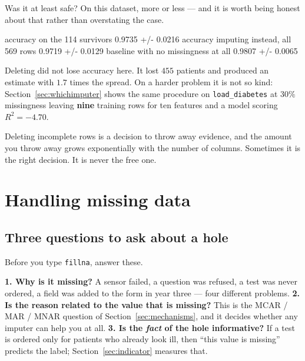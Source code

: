 \documentclass[11pt]{article}
\begin{document}
Was it at least safe? On this dataset, more or less --- and it is worth being
honest about that rather than overstating the case.

\begin{codeout}
accuracy on the 114 survivors             0.9735  +/- 0.0216
accuracy imputing instead, all 569 rows   0.9719  +/- 0.0129
baseline with no missingness at all       0.9807  +/- 0.0065
\end{codeout}

Deleting did not lose accuracy here. It lost $455$ patients and produced an
estimate with $1.7$ times the spread. On a harder problem it is not so kind:
Section~\ref{sec:whichimputer} shows the same procedure on
\texttt{load\_diabetes} at $30\%$ missingness leaving \textbf{nine} training
rows for ten features and a model scoring $R^2 = -4.70$.

\begin{keyidea}
Deleting incomplete rows is a decision to throw away evidence, and the amount
you throw away grows exponentially with the number of columns. Sometimes it is
the right decision. It is never the free one.
\end{keyidea}

\notesources{\AMLUnitIVSources}

\section{Handling missing data}
\label{sec:missing}

\subsection{Three questions to ask about a hole}

Before you type \texttt{fillna}, answer these.

\textbf{1. Why is it missing?} A sensor failed, a question was refused, a test
was never ordered, a field was added to the form in year three --- four
different problems. \textbf{2. Is the reason related to the value that is
missing?} This is the MCAR / MAR / MNAR question of
Section~\ref{sec:mechanisms}, and it decides whether any imputer can help you
at all. \textbf{3. Is the \emph{fact} of the hole informative?} If a test is
ordered only for patients who already look ill, then ``this value is missing''
predicts the label; Section~\ref{sec:indicator} measures that.
\end{document}
